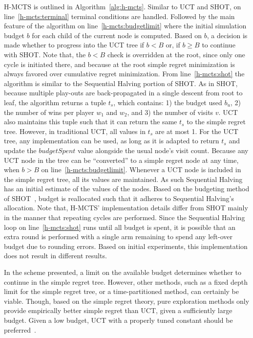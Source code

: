 \documentclass[a4paper]{llncs}
\begin{document}
H-MCTS is outlined in Algorithm~\ref{alg:h-mcts}. Similar to UCT and SHOT, on line~\ref{h-mcts:terminal} terminal conditions are handled. Followed by the main feature of the algorithm on line~\ref{h-mcts:budgetlimit} where the initial simulation budget $b$ for each child of the current node is computed. Based on $b$, a decision is made whether to progress into the UCT tree if $b<B$ or, if $b \geq B$ to continue with SHOT. Note that, the $b<B$ check is overridden at the root, since only one cycle is initiated there, and because at the root simple regret minimization is always favored over cumulative regret minimization. From line~\ref{h-mcts:shot} the algorithm is similar to the Sequential Halving portion of SHOT. As in SHOT, because multiple play-outs are back-propagated in a single descent from root to leaf, the algorithm returns a tuple $t_s$, which contains: 1) the budget used $b_u$, 2) the number of wins per player $w_1$ and $w_2$, and 3) the number of visits $v$. UCT also maintains this tuple such that it can return the same $t_s$ to the simple regret tree. However, in traditional UCT, all values in $t_s$ are at most 1. For the UCT tree, any implementation can be used, as long as it is adapted to return $t_s$ and update the $budgetSpent$ value alongside the usual node's visit count. Because any UCT node in the tree can be ``converted'' to a simple regret node at any time, when $b>B$ on line~\ref{h-mcts:budgetlimit}. Whenever a UCT node is included in the simple regret tree, all its values are maintained. As such Sequential Halving has an initial estimate of the values of the nodes. Based on the budgeting method of SHOT~\cite{Cazenave14SHOT}, budget is reallocated such that it adheres to Sequential Halving's allocation. Note that, H-MCTS' implementation details differ from SHOT mainly in the manner that repeating cycles are performed. Since the Sequential Halving loop on line~\ref{h-mcts:shot} runs until all budget is spent, it is possible that an extra round is performed with a single arm remaining to spend any left-over budget due to rounding errors. Based on initial experiments, this implementation does not result in different results.

In the scheme presented, a limit on the available budget determines whether to continue in the simple regret tree. However, other methods, such as a fixed depth limit for the simple regret tree, or a time-partitioned method, can certainly be viable. Though, based on the simple regret theory, pure exploration methods  only provide empirically better simple regret than UCT, given a sufficiently large budget. Given a low budget, UCT with a properly tuned constant should be preferred~\cite{Bubeck11Pure}.
\end{document}
